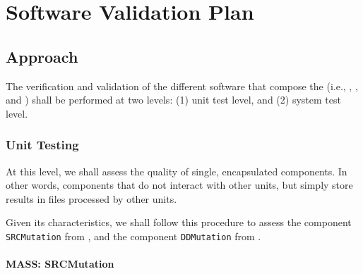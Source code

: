 
\chapter{Software Validation Plan}

%

\section{Approach}

The verification and validation of the different software that compose the \FAQAS (i.e., \MASS, \SEMUS, and \DAMA) shall be performed at two levels: (1) unit test level, and (2) system test level.

\subsection{Unit Testing}

At this level, we shall assess the quality of single, encapsulated components. In other words, components that do not interact with other units, but simply store results in files processed by other units.

Given its characteristics, we shall follow this procedure to assess the component \texttt{SRCMutation} from \MASS, and the component \texttt{DDMutation} from \DAMA.

\subsubsection{MASS: SRCMutation}

